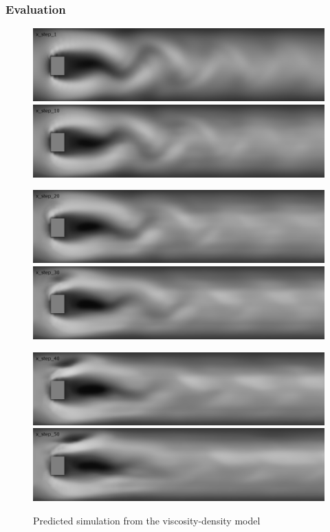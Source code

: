 \documentclass[18pt, xcolor=table]{beamer}
\begin{document}
\begin{frame}[t]
  \frametitle{Evaluation}

  \begin{center}
    \begin{figure}[htb]
    \includegraphics[scale=0.15]{images/rec_flow/x_step_1}
    \includegraphics[scale=0.15]{images/rec_flow/x_step_10}

    \includegraphics[scale=0.15]{images/rec_flow/x_step_20}
    \includegraphics[scale=0.15]{images/rec_flow/x_step_30}

    \includegraphics[scale=0.15]{images/rec_flow/x_step_40}
    \includegraphics[scale=0.15]{images/rec_flow/x_step_50}

    \caption{Predicted simulation from the viscosity-density model}
  \end{figure}
  \end{center}

\end{frame}
\end{document}
